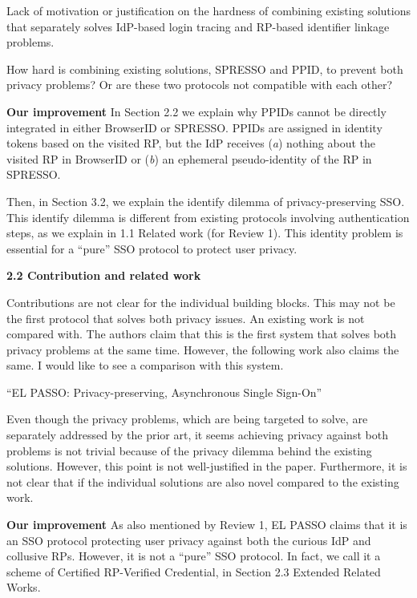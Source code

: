 \documentclass[letterpaper,onecolumn,10pt]{article}
\begin{document}
Lack of motivation or justification on the hardness of combining existing solutions that separately solves IdP-based login tracing and RP-based identifier linkage problems.

How hard is combining existing solutions, SPRESSO and PPID, to prevent both privacy problems? Or are these two protocols not compatible with each other?

\vspace{1mm}\noindent\textbf{Our improvement}
In Section 2.2 we explain why PPIDs cannot be directly integrated in either BrowserID or SPRESSO.
PPIDs are assigned in identity tokens based on the visited RP, but the IdP receives (\emph{a}) nothing about the
visited RP in BrowserID or (\emph{b}) an ephemeral pseudo-identity of the RP in SPRESSO.

Then, in Section 3.2, we explain the identify dilemma of privacy-preserving SSO.
This identify dilemma is different from existing protocols involving authentication steps,
    as we explain in 1.1 Related work (for Review 1).
This identity problem is essential for a ``pure'' SSO protocol to protect user privacy.

\vspace{1mm}\noindent\textbf{2.2 Contribution and related work}

Contributions are not clear for the individual building blocks.
This may not be the first protocol that solves both privacy issues. An existing work is not compared with.
The authors claim that this is the first system that solves both privacy problems at the same time. However, the following work also claims the same. I would like to see a comparison with this system.

\noindent``EL PASSO: Privacy-preserving, Asynchronous Single Sign-On''

Even though the privacy problems, which are being targeted to solve, are separately addressed by the prior art,
 it seems achieving privacy against both problems is not trivial because of the privacy dilemma behind the existing solutions.
However, this point is not well-justified in the paper.
Furthermore, it is not clear that if the individual solutions are also novel compared to the existing work.

\vspace{1mm}\noindent\textbf{Our improvement}
As also mentioned by Review 1, EL PASSO claims that it is an SSO protocol protecting user privacy against both the curious IdP and collusive RPs.
However, it is not a ``pure'' SSO protocol. In fact, we call it a scheme of Certified RP-Verified Credential, in Section 2.3 Extended Related Works.
\end{document}
